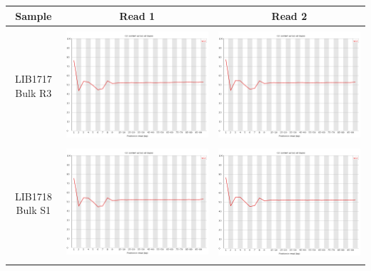\begin{center}
\begin{tabular}{ccc}
\toprule
Sample  & Read 1 & Read 2 \\ \midrule 
\\

\begin{sideways}LIB1717 Bulk R3\end{sideways} & \includegraphics[width=0.4 \textwidth]{Appendices/images/Sample_LIB1717_base_gc_R1.png} & \includegraphics[width=0.4 \textwidth]{Appendices/images/Sample_LIB1717_base_gc_R2.png} \\ \midrule  \\
\begin{sideways}LIB1718 Bulk S1\end{sideways} & \includegraphics[width=0.4 \textwidth]{Appendices/images/Sample_LIB1718_base_gc_R1.png} & \includegraphics[width=0.4 \textwidth]{Appendices/images/Sample_LIB1718_base_gc_R2.png} \\ \midrule  \\

\end{tabular}
\end{center}
